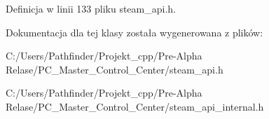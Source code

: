 Definicja w linii 133 pliku steam\+\_\+api.\+h.



Dokumentacja dla tej klasy została wygenerowana z plików\+:\begin{DoxyCompactItemize}
\item 
C\+:/\+Users/\+Pathfinder/\+Projekt\+\_\+cpp/\+Pre-\/\+Alpha Relase/\+P\+C\+\_\+\+Master\+\_\+\+Control\+\_\+\+Center/steam\+\_\+api.\+h\item 
C\+:/\+Users/\+Pathfinder/\+Projekt\+\_\+cpp/\+Pre-\/\+Alpha Relase/\+P\+C\+\_\+\+Master\+\_\+\+Control\+\_\+\+Center/steam\+\_\+api\+\_\+internal.\+h\end{DoxyCompactItemize}

